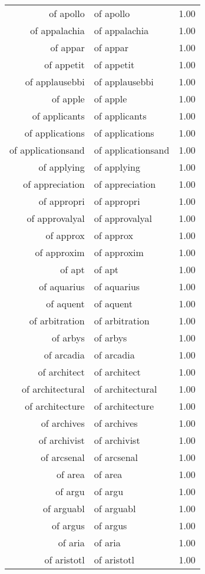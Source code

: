 \begin{table}[ht]
\begin{tabular}{rlr}
  of apollo & of apollo & 1.00 \\ 
  of appalachia & of appalachia & 1.00 \\ 
  of appar & of appar & 1.00 \\ 
  of appetit & of appetit & 1.00 \\ 
  of applausebbi & of applausebbi & 1.00 \\ 
  of apple & of apple & 1.00 \\ 
  of applicants & of applicants & 1.00 \\ 
  of applications & of applications & 1.00 \\ 
  of applicationsand & of applicationsand & 1.00 \\ 
  of applying & of applying & 1.00 \\ 
  of appreciation & of appreciation & 1.00 \\ 
  of appropri & of appropri & 1.00 \\ 
  of approvalyal & of approvalyal & 1.00 \\ 
  of approx & of approx & 1.00 \\ 
  of approxim & of approxim & 1.00 \\ 
  of apt & of apt & 1.00 \\ 
  of aquarius & of aquarius & 1.00 \\ 
  of aquent & of aquent & 1.00 \\ 
  of arbitration & of arbitration & 1.00 \\ 
  of arbys & of arbys & 1.00 \\ 
  of arcadia & of arcadia & 1.00 \\ 
  of architect & of architect & 1.00 \\ 
  of architectural & of architectural & 1.00 \\ 
  of architecture & of architecture & 1.00 \\ 
  of archives & of archives & 1.00 \\ 
  of archivist & of archivist & 1.00 \\ 
  of arcsenal & of arcsenal & 1.00 \\ 
  of area & of area & 1.00 \\ 
  of argu & of argu & 1.00 \\ 
  of arguabl & of arguabl & 1.00 \\ 
  of argus & of argus & 1.00 \\ 
  of aria & of aria & 1.00 \\ 
  of aristotl & of aristotl & 1.00 \\ 

\end{tabular}
\end{table}
